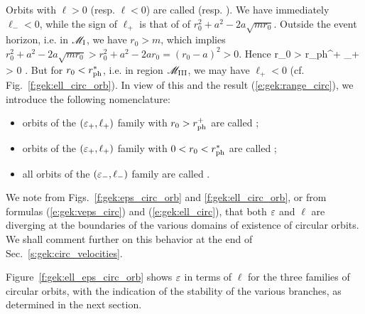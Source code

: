 Orbits with $\ell > 0$ (resp. $\ell < 0$) are called 
(resp. ).
We have immediately $\ell_- < 0$, while the sign of $\ell_+$ is that of
of $r_0^2 + a^2 - 2 a \sqrt{mr_0}$.
Outside the event horizon, i.e. in $\mathscr{M}_{\rm I}$, we have $r_0 > m$, which
implies $r_0^2 + a^2 - 2 a \sqrt{mr_0} > r_0^2 + a^2 - 2 a r_0 = (r_0 - a)^2 > 0$. Hence
\be
    r_0 > r_{\rm ph}^+ \quad\Longrightarrow\quad \ell_+ > 0 .
\ee
But for $r_0 < r_{\rm ph}^*$, i.e. in region $\mathscr{M}_{\rm III}$, we may have $\ell_+ < 0$
(cf. Fig.~\ref{f:gek:ell_circ_orb}).
In view of this and the result (\ref{e:gek:range_circ}), we introduce the following nomenclature:
\begin{itemize}
\item orbits of the $(\varepsilon_+,\ell_+)$ family with $r_0 >  r_{\rm ph}^+$
are called ;
\item orbits of the $(\varepsilon_+,\ell_+)$ family with $0 < r_0 < r_{\rm ph}^*$
are called ;
\item all orbits of the $(\varepsilon_-,\ell_-)$ family
are called .
\end{itemize}

We note from Figs.~\ref{f:gek:eps_circ_orb} and \ref{f:gek:ell_circ_orb},
or from formulas (\ref{e:gek:veps_circ}) and (\ref{e:gek:ell_circ}),
that both $\varepsilon$ and $\ell$ are diverging at the boundaries of the various domains
of existence of circular orbits. We shall comment further on this behavior at the end of
Sec.~\ref{s:gek:circ_velocities}.

Figure~\ref{f:gek:ell_eps_circ_orb} shows $\varepsilon$ in terms of $\ell$
for the three families of circular orbits, with the indication of
the stability of the various
branches, as determined in the next section.


